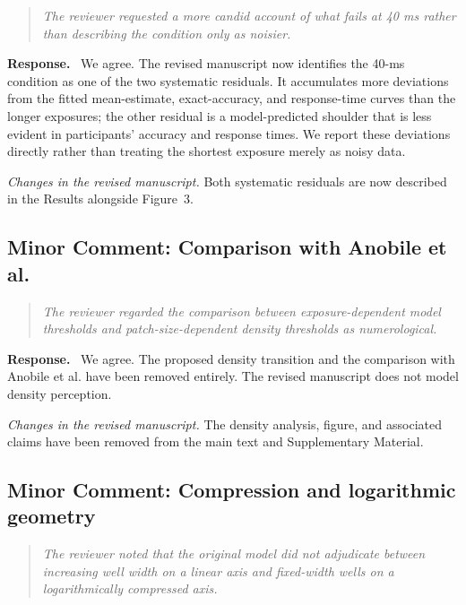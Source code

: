 \documentclass[11pt]{article}
\newenvironment{reviewercomment}{\begin{quote}\color{reviewgray}\itshape}{\end{quote}}
\newenvironment{authorresponse}{\par\noindent\textbf{\color{responseblue}Response.}\ }{\par}
\newcommand{\change}[1]{\par\noindent\textit{Changes in the revised manuscript.} #1\par}
\begin{document}
\begin{reviewercomment}
The reviewer requested a more candid account of what fails at 40 ms rather than describing the condition only as noisier.
\end{reviewercomment}

\begin{authorresponse}
We agree. The revised manuscript now identifies the 40-ms condition as one of the two systematic residuals. It accumulates more deviations from the fitted mean-estimate, exact-accuracy, and response-time curves than the longer exposures; the other residual is a model-predicted shoulder that is less evident in participants' accuracy and response times. We report these deviations directly rather than treating the shortest exposure merely as noisy data.
\end{authorresponse}

\change{Both systematic residuals are now described in the Results alongside Figure~3.}

\subsection*{Minor Comment: Comparison with Anobile et al.}

\begin{reviewercomment}
The reviewer regarded the comparison between exposure-dependent model thresholds and patch-size-dependent density thresholds as numerological.
\end{reviewercomment}

\begin{authorresponse}
We agree. The proposed density transition and the comparison with Anobile et al. have been removed entirely. The revised manuscript does not model density perception.
\end{authorresponse}

\change{The density analysis, figure, and associated claims have been removed from the main text and Supplementary Material.}

\subsection*{Minor Comment: Compression and logarithmic geometry}

\begin{reviewercomment}
The reviewer noted that the original model did not adjudicate between increasing well width on a linear axis and fixed-width wells on a logarithmically compressed axis.
\end{reviewercomment}
\end{document}
